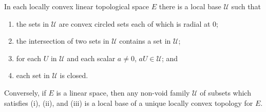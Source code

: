 In each locally convex linear topological space $E$ there is a local base $\mathcal{U}$ such that
\begin{enumerate}
\item[(i)] the sets in $\mathcal{U}$ are convex circled sets each of which is radial at $0$;
\item[(ii)] the intersection of two sets in $\mathcal{U}$ contains a set in $\mathcal{U}$;
\item[(iii)] for each $U$ in $\mathcal{U}$ and each scalar $a \neq 0$, $aU \in \mathcal{U}$; and
\item[(iv)] each set in $\mathcal{U}$ is closed.
\end{enumerate}
Conversely, if $E$ is a linear space, then any non-void family $\mathcal{U}$ of subsets which satisfies (i), (ii), and (iii) is a local base of a unique locally convex topology for $E$.
